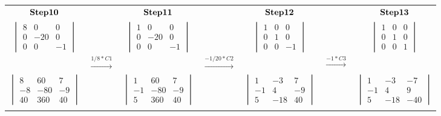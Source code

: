\documentclass[]{article}
\begin{document}
\begin{tabular}{ c c c c c c c }
$\bold{Step 10}$ &  & $\bold{Step 11}$  &  & $\bold{Step 12}$ & & $\bold{Step 13}$ \\
$\begin{vmatrix} 8 & 0 & 0\\ 0 & -20 & 0 \\ 0 & 0 & -1 \end{vmatrix}$ &  & $\begin{vmatrix} 1 & 0 & 0\\ 0 & -20 & 0 \\ 0 & 0 & -1 \end{vmatrix}$ &  &
$\begin{vmatrix} 1 & 0 & 0\\ 0 & 1 & 0 \\ 0 & 0 & -1 \end{vmatrix}$ &  &
$\begin{vmatrix} 1 & 0 & 0\\ 0 & 1 & 0 \\ 0 & 0 & 1 \end{vmatrix}$\\
 & $\xrightarrow{1/8 * C1}$ &  & $\xrightarrow{-1/20 *C2}$ & & $\xrightarrow{-1*C3}$ \\ 
$\begin{vmatrix} 8 &   60 &  7\\ -8 & -80 &   -9 \\ 40 &   360 &   40 \end{vmatrix}$ &  &
$\begin{vmatrix} 1 &  60 &   7\\ -1 & -80 &   -9\\ 5 & 360 &  40 \end{vmatrix}$ & &
$\begin{vmatrix} 1 &  -3 &   7\\ -1 &   4 &   -9\\ 5 & -18 &   40 \end{vmatrix}$ & &
$\begin{vmatrix} 1 &  -3 &  -7\\ -1 &   4 &    9 \\ 5 & -18 & -40 \end{vmatrix}$\\
 &  &  \\
\end{tabular}

\endgroup

\hspace{2cm}
\end{document}
